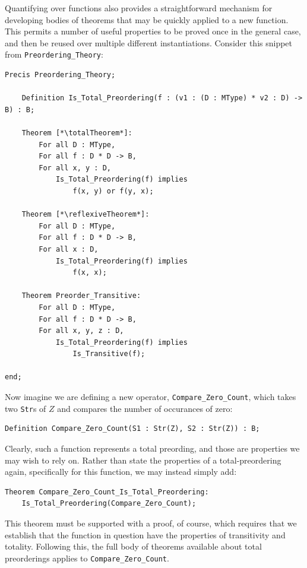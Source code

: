 Quantifying over functions also provides a straightforward mechanism for developing bodies of theorems that may be quickly applied to a new function.  This permits a number of useful properties to be proved once in the general case, and then be reused over multiple different instantiations.  Consider this snippet from \texttt{Preordering\_Theory}:

\newcommand{\reflexiveTheorem}{Preorder\_Reflexive}
\newcommand{\totalTheorem}{Total\_Preorder\_Total}

\begin{lstlisting}
Precis Preordering_Theory;

	Definition Is_Total_Preordering(f : (v1 : (D : MType) * v2 : D) -> B) : B;

	Theorem [*\totalTheorem*]:
		For all D : MType,
		For all f : D * D -> B,
		For all x, y : D,
			Is_Total_Preordering(f) implies
				f(x, y) or f(y, x);

	Theorem [*\reflexiveTheorem*]:
		For all D : MType,
		For all f : D * D -> B,
		For all x : D,
			Is_Total_Preordering(f) implies
				f(x, x);

	Theorem Preorder_Transitive:
		For all D : MType, 
		For all f : D * D -> B,
		For all x, y, z : D,
			Is_Total_Preordering(f) implies
				Is_Transitive(f);

end;
\end{lstlisting}

Now imagine we are defining a new operator, \texttt{Compare\_Zero\_Count}, which takes two \texttt{Str}s of $Z$ and compares the number of occurances of zero:

\begin{lstlisting}
Definition Compare_Zero_Count(S1 : Str(Z), S2 : Str(Z)) : B;
\end{lstlisting}

Clearly, such a function represents a total preording, and those are properties we may wish to rely on.  Rather than state the properties of a total-preordering again, specifically for this function, we may instead simply add:

\begin{lstlisting}
Theorem Compare_Zero_Count_Is_Total_Preordering:
	Is_Total_Preordering(Compare_Zero_Count);
\end{lstlisting} 

This theorem must be supported with a proof, of course, which requires that we establish that the function in question have the properties of transitivity and totality.  Following this, the full body of theorems available about total preorderings applies to \texttt{Compare\_Zero\_Count}.

